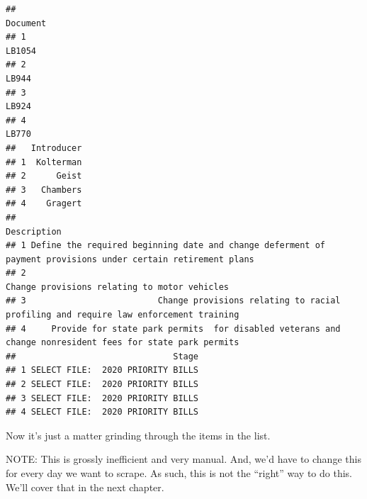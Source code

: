 \documentclass[]{book}
\newenvironment{Shaded}{\begin{snugshade}}{\end{snugshade}}
\newcommand{\CharTok}[1]{\textcolor[rgb]{0.31,0.60,0.02}{#1}}
\newcommand{\DataTypeTok}[1]{\textcolor[rgb]{0.13,0.29,0.53}{#1}}
\newcommand{\DecValTok}[1]{\textcolor[rgb]{0.00,0.00,0.81}{#1}}
\newcommand{\KeywordTok}[1]{\textcolor[rgb]{0.13,0.29,0.53}{\textbf{#1}}}
\newcommand{\NormalTok}[1]{#1}
\newcommand{\OperatorTok}[1]{\textcolor[rgb]{0.81,0.36,0.00}{\textbf{#1}}}
\newcommand{\StringTok}[1]{\textcolor[rgb]{0.31,0.60,0.02}{#1}}
\begin{document}
\begin{verbatim}
##                                                                Document
## 1                                                                LB1054
## 2                                                                 LB944
## 3                                                                 LB924
## 4                                                                 LB770
##   Introducer
## 1  Kolterman
## 2      Geist
## 3   Chambers
## 4    Gragert
##                                                                                                    Description
## 1 Define the required beginning date and change deferment of payment provisions under certain retirement plans
## 2                                                                 Change provisions relating to motor vehicles
## 3                          Change provisions relating to racial profiling and require law enforcement training
## 4     Provide for state park permits  for disabled veterans and change nonresident fees for state park permits
##                               Stage
## 1 SELECT FILE:  2020 PRIORITY BILLS
## 2 SELECT FILE:  2020 PRIORITY BILLS
## 3 SELECT FILE:  2020 PRIORITY BILLS
## 4 SELECT FILE:  2020 PRIORITY BILLS
\end{verbatim}

Now it's just a matter grinding through the items in the list.

NOTE: This is grossly inefficient and very manual. And, we'd have to change this for every day we want to scrape. As such, this is not the ``right'' way to do this. We'll cover that in the next chapter.

\begin{Shaded}
\end{Shaded}
\end{document}
